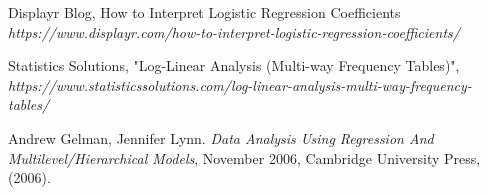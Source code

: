 \documentclass[a4paper]{article}
\begin{document}
\begin{thebibliography}{1}
Displayr Blog, How to Interpret Logistic Regression Coefficients \textit{https://www.displayr.com/how-to-interpret-logistic-regression-coefficients/}

Statistics Solutions, "Log-Linear Analysis (Multi-way Frequency Tables)", \textit{https://www.statisticssolutions.com/log-linear-analysis-multi-way-frequency-tables/}

Andrew Gelman, Jennifer Lynn. \emph{Data Analysis Using Regression And Multilevel/Hierarchical Models}, November 2006, Cambridge University Press, (2006).

\end{thebibliography}

\end{document}
